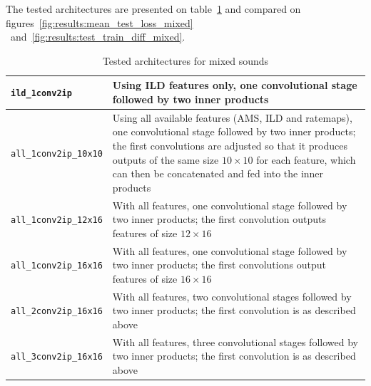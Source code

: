 The tested architectures are presented on table~\ref{fig:results:mixed_table} and compared on figures~\ref{fig:results:mean_test_loss_mixed} ~and~\ref{fig:results:test_train_diff_mixed}.
\renewcommand{\arraystretch}{1.5}
\begin{table}[htb]
\begin{tabular}{|p{}|p{}|}
\hline
\verb+ild_1conv2ip+ & Using ILD features only, one convolutional stage followed by two inner products \tabularnewline
\hline
\verb+all_1conv2ip_10x10+ & Using all available features (AMS, ILD and ratemaps), one convolutional stage followed by two inner products; the first convolutions are adjusted so that it produces outputs of the same size $10\times10$ for each feature, which can then be concatenated and fed into the inner products \tabularnewline
\hline
\verb+all_1conv2ip_12x16+ & With all features, one convolutional stage followed by two inner products; the first convolution outputs features of size $12\times16$ \tabularnewline
\hline
\verb+all_1conv2ip_16x16+ & With all features, one convolutional stage followed by two inner products; the first convolutions output features of size $16\times16$ \tabularnewline
\hline
\verb+all_2conv2ip_16x16+ & With all features, two convolutional stages followed by two inner products; the first convolution is as described above \tabularnewline
\hline
\verb+all_3conv2ip_16x16+ & With all features, three convolutional stages followed by two inner products; the first convolution is as described above \\
\hline
\end{tabular}
\\
\caption{Tested architectures for mixed sounds}
\label{fig:results:mixed_table}
\end{table}
